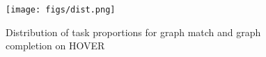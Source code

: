 

\begin{figure}[h]
    \centering
    \texttt{[image: figs/dist.png]}
    \caption{Distribution of task proportions for graph match and graph completion on HOVER}
    \label{fig:dist}
\end{figure}


